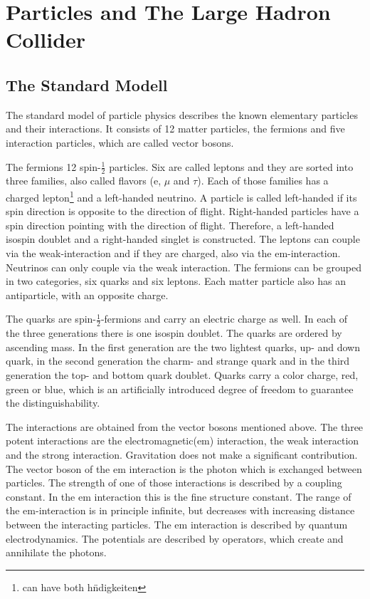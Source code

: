\chapter{Particles and The Large Hadron Collider}
\label{sec:particleslhc}

\section{The Standard Modell}
\label{sec:sm}
The standard model of particle physics describes the known elementary particles and their interactions. It consists of 12 matter particles, the fermions
and five interaction particles, which are called vector bosons.

The fermions 12 spin-$\frac{1}{2}$ particles. Six are called leptons and they are sorted into three families, also called flavors (e, $\mu$ and $\tau$). Each of those families has a charged lepton\footnote{can have both h\"ndigkeiten} and a left-handed neutrino.
A particle is called left-handed if its spin direction is opposite to the direction of flight. Right-handed particles have a spin direction pointing with the direction of flight. Therefore, a left-handed isospin doublet and a right-handed singlet is constructed.
The leptons can couple via the weak-interaction and if they are charged, also via the em-interaction. Neutrinos can only couple via the weak interaction.
The fermions can be grouped in two categories, six quarks and
six leptons.
Each matter particle also has an antiparticle, with an opposite charge.

The quarks are spin-$\frac{1}{2}$-fermions and carry an electric charge as well. In each of the three generations there is one isospin doublet. The quarks are ordered by ascending mass. In the first generation are the two lightest quarks,
up- and down quark, in the second generation the charm- and strange quark and
in the third generation the top- and bottom quark doublet.
Quarks carry a color charge, red, green or blue, which is an artificially introduced degree of freedom to guarantee the distinguishability.

The interactions are obtained from the vector bosons mentioned above.
The three potent interactions are the electromagnetic(em) interaction,
the weak interaction and the strong interaction. Gravitation does not make a significant contribution.
The vector boson of the em interaction is the photon which is exchanged between particles.
The strength of one of those interactions is
described by a coupling constant. In the em interaction this is the
fine structure constant\cite{alphas}. The range of the em-interaction is in principle
infinite, but decreases with increasing distance between the interacting particles.
The em interaction is described by quantum electrodynamics.
The potentials are described by operators, which create and annihilate the photons.

